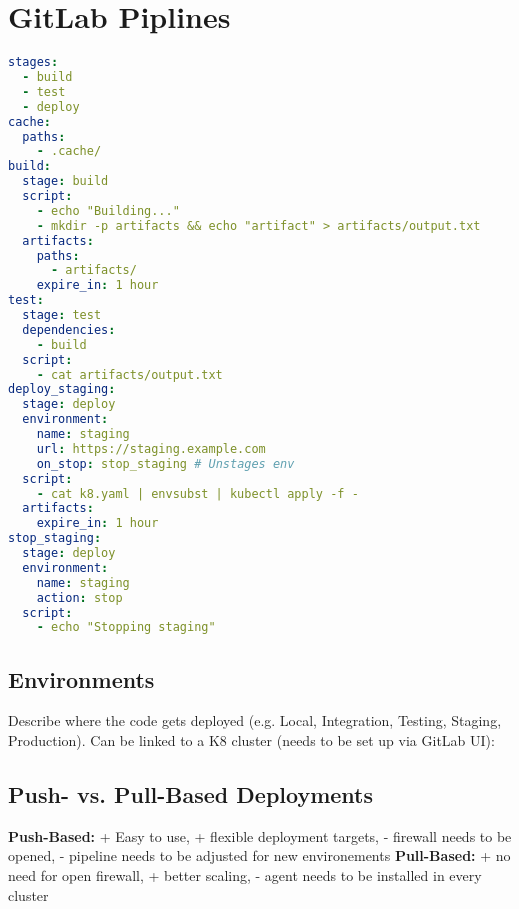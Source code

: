 \section{GitLab Piplines}
\begin{lstlisting}[language=yaml]
stages:
  - build
  - test
  - deploy
cache:
  paths:
    - .cache/
build:
  stage: build
  script:
    - echo "Building..."
    - mkdir -p artifacts && echo "artifact" > artifacts/output.txt
  artifacts:
    paths:
      - artifacts/
    expire_in: 1 hour
test:
  stage: test
  dependencies:
    - build
  script:
    - cat artifacts/output.txt
deploy_staging:
  stage: deploy
  environment:
    name: staging
    url: https://staging.example.com
    on_stop: stop_staging # Unstages env
  script:
    - cat k8.yaml | envsubst | kubectl apply -f -
  artifacts:
    expire_in: 1 hour
stop_staging:
  stage: deploy
  environment:
    name: staging
    action: stop
  script:
    - echo "Stopping staging"
\end{lstlisting}
\subsection{Environments}
Describe where the code gets deployed (e.g. Local, Integration, Testing, Staging, Production). Can be linked to a K8 cluster (needs to be set up via GitLab UI):
\subsection{Push- vs. Pull-Based Deployments}
\textbf{Push-Based:} + Easy to use, + flexible deployment targets, - firewall needs to be opened, - pipeline needs to be adjusted for new environements \textbf{Pull-Based:} + no need for open firewall, + better scaling, - agent needs to be installed in every cluster
